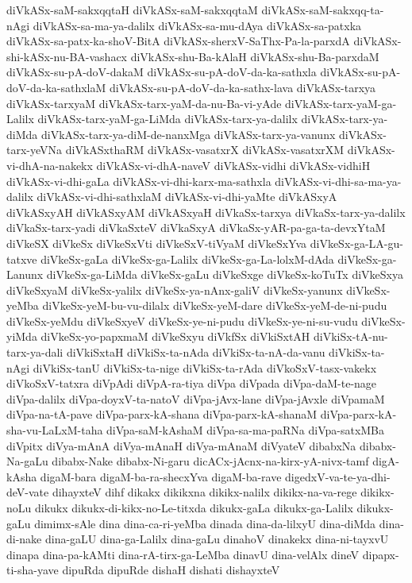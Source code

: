 {diVkASx-saM-sakxqqtaH
diVkASx-saM-sakxqqtaM
diVkASx-saM-sakxqq-ta-nAgi
diVkASx-sa-ma-ya-dalilx
diVkASx-sa-mu-dAya
diVkASx-sa-patxka
diVkASx-sa-patx-ka-shoV-BitA
diVkASx-sherxV-SaThx-Pa-la-parxdA
diVkASx-shi-kASx-nu-BA-vashacx
diVkASx-shu-Ba-kAlaH
diVkASx-shu-Ba-parxdaM
diVkASx-su-pA-doV-dakaM
diVkASx-su-pA-doV-da-ka-sathxla
diVkASx-su-pA-doV-da-ka-sathxlaM
diVkASx-su-pA-doV-da-ka-sathx-lava
diVkASx-tarxya
diVkASx-tarxyaM
diVkASx-tarx-yaM-da-nu-Ba-vi-yAde
diVkASx-tarx-yaM-ga-Lalilx
diVkASx-tarx-yaM-ga-LiMda
diVkASx-tarx-ya-dalilx
diVkASx-tarx-ya-diMda
diVkASx-tarx-ya-diM-de-nanxMga
diVkASx-tarx-ya-vanunx
diVkASx-tarx-yeVNa
diVkASxthaRM
diVkASx-vasatxrX
diVkASx-vasatxrXM
diVkASx-vi-dhA-na-nakekx
diVkASx-vi-dhA-naveV
diVkASx-vidhi
diVkASx-vidhiH
diVkASx-vi-dhi-gaLa
diVkASx-vi-dhi-karx-ma-sathxla
diVkASx-vi-dhi-sa-ma-ya-dalilx
diVkASx-vi-dhi-sathxlaM
diVkASx-vi-dhi-yaMte
diVkASxyA
diVkASxyAH
diVkASxyAM
diVkASxyaH
diVkaSx-tarxya
diVkaSx-tarx-ya-dalilx
diVkaSx-tarx-yadi
diVkaSxteV
diVkaSxyA
diVkaSx-yAR-pa-ga-ta-devxYtaM
diVkeSX
diVkeSx
diVkeSxVti
diVkeSxV-tiVyaM
diVkeSxYva
diVkeSx-ga-LA-gu-tatxve
diVkeSx-gaLa
diVkeSx-ga-Lalilx
diVkeSx-ga-La-lolxM-dAda
diVkeSx-ga-Lanunx
diVkeSx-ga-LiMda
diVkeSx-gaLu
diVkeSxge
diVkeSx-koTuTx
diVkeSxya
diVkeSxyaM
diVkeSx-yalilx
diVkeSx-ya-nAnx-galiV
diVkeSx-yanunx
diVkeSx-yeMba
diVkeSx-yeM-bu-vu-dilalx
diVkeSx-yeM-dare
diVkeSx-yeM-de-ni-pudu
diVkeSx-yeMdu
diVkeSxyeV
diVkeSx-ye-ni-pudu
diVkeSx-ye-ni-su-vudu
diVkeSx-yiMda
diVkeSx-yo-papxmaM
diVkeSxyu
diVkfSx
diVkiSxtAH
diVkiSx-tA-nu-tarx-ya-dali
diVkiSxtaH
diVkiSx-ta-nAda
diVkiSx-ta-nA-da-vanu
diVkiSx-ta-nAgi
diVkiSx-tanU
diVkiSx-ta-nige
diVkiSx-ta-rAda
diVkoSxV-tasx-vakekx
diVkoSxV-tatxra
diVpAdi
diVpA-ra-tiya
diVpa
diVpada
diVpa-daM-te-nage
diVpa-dalilx
diVpa-doyxV-ta-natoV
diVpa-jAvx-lane
diVpa-jAvxle
diVpamaM
diVpa-na-tA-pave
diVpa-parx-kA-shana
diVpa-parx-kA-shanaM
diVpa-parx-kA-sha-vu-LaLxM-taha
diVpa-saM-kAshaM
diVpa-sa-ma-paRNa
diVpa-satxMBa
diVpitx
diVya-mAnA
diVya-mAnaH
diVya-mAnaM
diVyateV
dibabxNa
dibabx-Na-gaLu
dibabx-Nake
dibabx-Ni-garu
dicACx-jAcnx-na-kirx-yA-nivx-tamf
digA-kAsha
digaM-bara
digaM-ba-ra-shecxYva
digaM-ba-rave
digedxV-va-te-ya-dhi-deV-vate
dihayxteV
dihf
dikakx
dikikxna
dikikx-nalilx
dikikx-na-va-rege
dikikx-noLu
dikukx
dikukx-di-kikx-no-Le-titxda
dikukx-gaLa
dikukx-ga-Lalilx
dikukx-gaLu
dimimx-sAle
dina
dina-ca-ri-yeMba
dinada
dina-da-lilxyU
dina-diMda
dina-di-nake
dina-gaLU
dina-ga-Lalilx
dina-gaLu
dinahoV
dinakekx
dina-ni-tayxvU
dinapa
dina-pa-kAMti
dina-rA-tirx-ga-LeMba
dinavU
dina-velAlx
dineV
dipapx-ti-sha-yave
dipuRda
dipuRde
dishaH
dishati
dishayxteV
}
